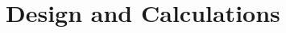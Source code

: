 \documentclass[a4paper,openany,fleqn,final]{memoir}
\begin{document}
\begin{titlingpage}
\titlePSU
\end{titlingpage}

\tableofcontents

\chapter{Design and Calculations}



\end{document}
